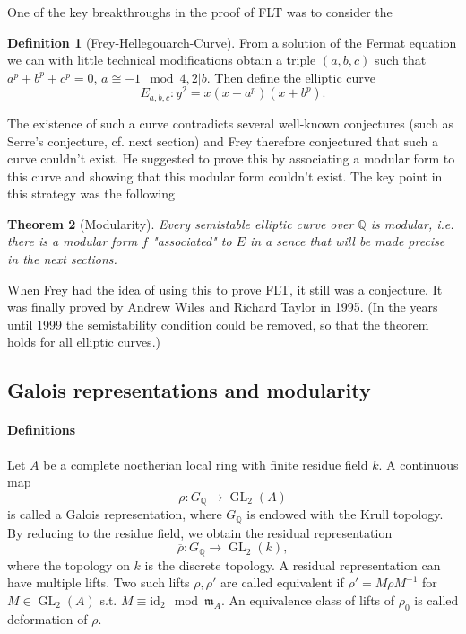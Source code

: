\documentclass{article}
\theoremstyle{plain}%
\newtheorem{theorem}{Theorem}[section]
\theoremstyle{definition}
\newtheorem{definition}[theorem]{Definition}
\theoremstyle{remark}
\newcommand{\GL}{\operatorname{GL}}
\begin{document}
One of the key breakthroughs in the proof of FLT was to consider the
\begin{definition}[Frey-Hellegouarch-Curve]
    From a solution of the Fermat equation we can with little technical modifications obtain a triple \((a,b,c)\) 
    such that \(a^p + b^p + c^p = 0\), \(a \cong -1 \mod 4, 2|b\). Then define the elliptic curve
    \[
        E_{a,b,c}\colon y^2 = x(x-a^p)(x+b^p).
    \]
\end{definition}
The existence of such a curve contradicts several well-known 
conjectures (such as Serre's conjecture, cf. next section) 
and Frey therefore conjectured that such a curve couldn't exist.
He suggested to prove this by associating a modular form to this curve and showing that this modular form couldn't exist.
The key point in this strategy was the following
\begin{theorem}[Modularity]\label{th:modularity}
    Every semistable elliptic curve over \(\mathbb Q\) is modular, i.e. there is a modular form \(f\) "associated" to \(E\)
    in a sence that will be made precise in the next sections.
\end{theorem}
When Frey had the idea of using this to prove FLT, it still was a conjecture.
It was finally proved by Andrew Wiles and Richard Taylor in 1995.
(In the years until 1999 the semistability condition could be removed, so that
the theorem holds for all elliptic curves.)

\subsection{Galois representations and modularity}

\paragraph{Definitions}
Let \(A\) be a complete noetherian local ring with finite residue field \(k\).
A continuous map
\[
    \rho\colon G_\mathbb{Q} \to \GL_2(A)
\]
is called a Galois representation, where \(G_\mathbb{Q}\) is endowed with the Krull topology.
By reducing to the residue field, we obtain the residual representation
\[
    \overline{\rho}\colon G_\mathbb{Q} \to \GL_2(k),
\]
where the topology on \(k\) is the discrete topology.
A residual representation can have multiple lifts. Two such lifts \(\rho, \rho'\) are called equivalent
if \(\rho' = M\rho M^{-1}\) for \(M \in \GL_2(A)\) s.t. \(M \equiv \mathrm{id}_{2} \mod \mathfrak{m}_A\).
An equivalence class of lifts of \(\rho_0\) is called deformation of \(\rho\).
\end{document}
